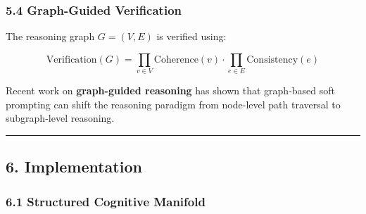 \documentclass[
  11pt,
  a4paper,
]{article}
\begin{document}
\subsubsection{5.4 Graph-Guided
Verification}\label{graph-guided-verification}

The reasoning graph \(G = (V, E)\) is verified using:

\[
\text{Verification}(G) = \prod_{v \in V} \text{Coherence}(v) \cdot \prod_{e \in E} \text{Consistency}(e)
\]

Recent work on \textbf{graph-guided reasoning} has shown that
graph-based soft prompting can shift the reasoning paradigm from
node-level path traversal to subgraph-level reasoning.

\begin{center}\rule{0.5\linewidth}{0.5pt}\end{center}

\subsection{6. Implementation}\label{implementation}

\subsubsection{6.1 Structured Cognitive
Manifold}\label{structured-cognitive-manifold-1}
\end{document}

